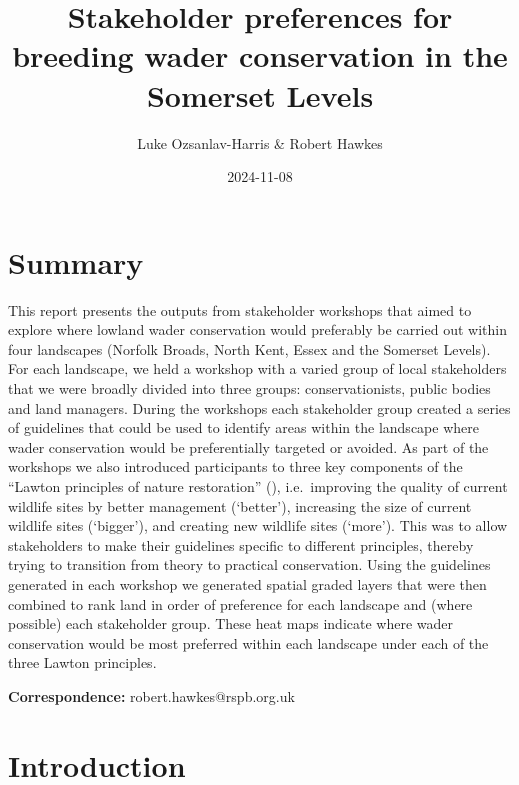 \documentclass[
  12pt,
  letterpaper,
  DIV=11,
  numbers=noendperiod]{scrartcl}
\title{Stakeholder preferences for breeding wader conservation in the
Somerset Levels}
\author{Luke Ozsanlav-Harris \& Robert Hawkes}
\date{2024-11-08}
\begin{document}
\maketitle


\section{Summary}\label{summary}

This report presents the outputs from stakeholder workshops that aimed
to explore where lowland wader conservation would preferably be carried
out within four landscapes (Norfolk Broads, North Kent, Essex and the
Somerset Levels). For each landscape, we held a workshop with a varied
group of local stakeholders that we were broadly divided into three
groups: conservationists, public bodies and land managers. During the
workshops each stakeholder group created a series of guidelines that
could be used to identify areas within the landscape where wader
conservation would be preferentially targeted or avoided. As part of the
workshops we also introduced participants to three key components of the
``Lawton principles of nature restoration''
(), i.e.~improving the
quality of current wildlife sites by better management (`better'),
increasing the size of current wildlife sites (`bigger'), and creating
new wildlife sites (`more'). This was to allow stakeholders to make
their guidelines specific to different principles, thereby trying to
transition from theory to practical conservation. Using the guidelines
generated in each workshop we generated spatial graded layers that were
then combined to rank land in order of preference for each landscape and
(where possible) each stakeholder group. These heat maps indicate where
wader conservation would be most preferred within each landscape under
each of the three Lawton principles.

\textbf{Correspondence:} robert.hawkes@rspb.org.uk

\newpage{}

\section{Introduction}\label{introduction}
\end{document}
